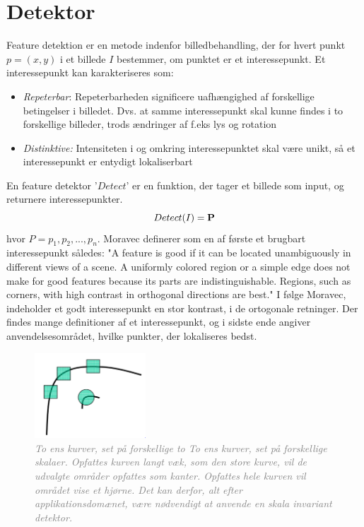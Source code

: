 \section{Detektor}\label{sec:detect}
Feature detektion er en metode indenfor billedbehandling, der for hvert punkt $p = (x,y)$ i et billede $I$ bestemmer, om punktet er et interessepunkt. Et interessepunkt kan karakteriseres som\cite{pointsurvey}:
\begin{itemize}
\item{\emph{Repeterbar}: Repeterbarheden significere uafhængighed af forskellige betingelser i billedet. Dvs. at samme interessepunkt skal kunne findes i to forskellige billeder, trods ændringer af f.eks lys og rotation}
\item{\emph{Distinktive:}
Intensiteten i og omkring interessepunktet skal være unikt, så et interessepunkt er entydigt lokaliserbart}
\end{itemize}
En feature detektor '$Detect$' er en funktion, der tager et billede som input, og returnere interessepunkter.
\begin{equation}
Detect(I)= \bold{P}
\label{detect}
\end{equation}
hvor $P = {p_1, p_2,..., p_n}$.
Moravec \cite{moravec} definerer som en af første et brugbart interessepunkt således: "A
feature is good if it can be located unambiguously in different views of a scene. A
uniformly colored region or a simple edge does not make for good features because
its parts are indistinguishable. Regions, such as corners, with high contrast in
orthogonal directions are best." I følge Moravec, indeholder et godt interessepunkt en stor kontrast, i de ortogonale retninger. Der findes mange definitioner af et interessepunkt, og i sidste ende angiver anvendelsesområdet, hvilke punkter, der lokaliseres bedst.
\begin{figure}[H]
    \centering
    \includegraphics[width=0.37\textwidth]{fig/28.png}
     \vspace{-1em}
    \begin{center}    
       \caption{\textcolor{gray}{\footnotesize \textit{To ens kurver, set på forskellige to To ens kurver, set på forskellige skalaer. Opfattes kurven langt væk, som den store kurve, vil de udvalgte områder opfattes som kanter. Opfattes hele kurven vil området vise et hjørne. Det kan derfor, alt efter applikationsdomænet, være nødvendigt at anvende en skala invariant detektor.}}}
    \label{fig:skal}
     \end{center}
     \vspace{-2.5em}
  \end{figure} \noindent
